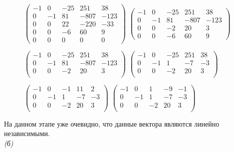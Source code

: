 \documentclass[10pt]{article}
\begin{document}
\begin{figure}[H]	
	\text{ = }
	$\begin{pmatrix}
		-1 & 0 & -25 & 251 & 38 \\
		0 & -1 & 81 & -807 & -123 \\
		0 & 0 & 22 & -220 & -33 \\
		0 & 0 & -6 & 60 & 9 \\
		0 & 0 & 0 & 0 & 0
	\end{pmatrix}$
	\text{ = }
	$\begin{pmatrix}
		-1 & 0 & -25 & 251 & 38 \\
		0 & -1 & 81 & -807 & -123 \\
		0 & 0 & -2 & 20 & 3 \\
		0 & 0 & -6 & 60 & 9
	\end{pmatrix}$
	\text{ = }	
			
	\text{ = }
	$\begin{pmatrix}
		-1 & 0 & -25 & 251 & 38 \\
		0 & -1 & 81 & -807 & -123 \\
		0 & 0 & -2 & 20 & 3 \\
	\end{pmatrix}$
	\text{ = }
	$\begin{pmatrix}
		-1 & 0 & -25 & 251 & 38 \\
		0 & -1 & 1 & -7 & -3 \\
		0 & 0 & -2 & 20 & 3 \\
	\end{pmatrix}$
	\text{ = }
	
	\text{ = }
	$\begin{pmatrix}
		-1 & 0 & -1 & 11 & 2 \\
		0 & -1 & 1 & -7 & -3 \\
		0 & 0 & -2 & 20 & 3 \\
	\end{pmatrix}$
	\text{ = }
	$\begin{pmatrix}
		-1 & 0 & 1 & -9 & -1 \\
		0 & -1 & 1 & -7 & -3 \\
		0 & 0 & -2 & 20 & 3 \\
	\end{pmatrix}$	
\end{figure}
На данном этапе уже очевидно, что данные вектора являются линейно независимыми. \\ \textsl{(б)}
\end{document}
